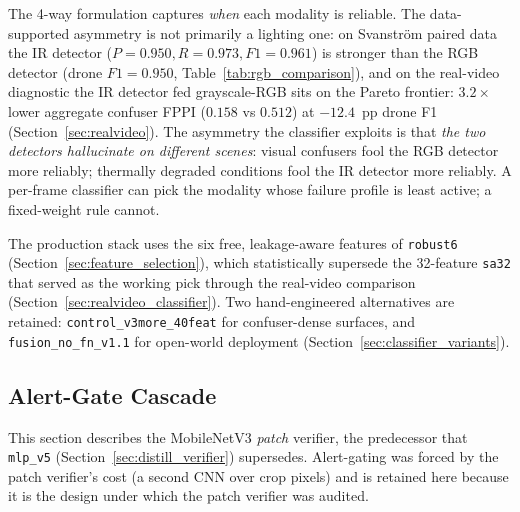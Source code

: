 The 4-way formulation captures \emph{when} each modality is reliable. The data-supported asymmetry is not primarily a lighting one: on Svanstr\"om paired data the IR detector ($P=0.950, R=0.973, F1=0.961$) is stronger than the RGB detector (drone $F1=0.950$, Table~\ref{tab:rgb_comparison}), and on the real-video diagnostic the IR detector fed grayscale-RGB sits on the Pareto frontier: $3.2\times$ lower aggregate confuser FPPI ($0.158$ vs $0.512$) at $-12.4$~pp drone F1 (Section~\ref{sec:realvideo}). The asymmetry the classifier exploits is that \emph{the two detectors hallucinate on different scenes}: visual confusers fool the RGB detector more reliably; thermally degraded conditions fool the IR detector more reliably. A per-frame classifier can pick the modality whose failure profile is least active; a fixed-weight rule cannot.

The production stack uses the six free, leakage-aware features of \texttt{robust6} (Section~\ref{sec:feature_selection}), which statistically supersede the 32-feature \texttt{sa32} that served as the working pick through the real-video comparison (Section~\ref{sec:realvideo_classifier}). Two hand-engineered alternatives are retained: \texttt{control\_v3more\_40feat} for confuser-dense surfaces, and \texttt{fusion\_no\_fn\_v1.1} for open-world deployment (Section~\ref{sec:classifier_variants}).

\subsection{Alert-Gate Cascade}
\label{sec:alert_gate}

This section describes the MobileNetV3 \emph{patch} verifier, the predecessor that \texttt{mlp\_v5} (Section~\ref{sec:distill_verifier}) supersedes. Alert-gating was forced by the patch verifier's cost (a second CNN over crop pixels) and is retained here because it is the design under which the patch verifier was audited.

